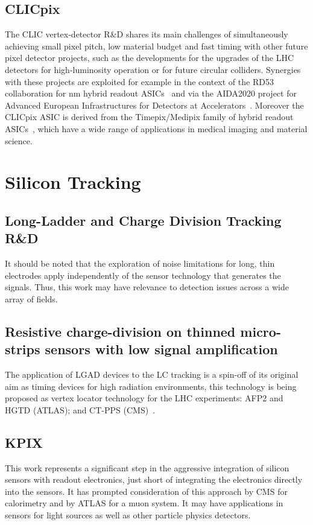\subsection{CLICpix}
The CLIC vertex-detector R\&D shares its main challenges of simultaneously achieving small pixel pitch,
low material budget and fast timing with other future pixel detector projects, such as the developments for
the upgrades of the LHC detectors for high-luminosity operation or for future circular colliders.
Synergies with these projects are exploited for example in the context of the RD53 collaboration for \unit[65]{nm} hybrid readout
ASICs~\cite{RD53} and via the AIDA2020 project for Advanced European Infrastructures for Detectors at
Accelerators~\cite{AIDA2020}.
Moreover the CLICpix ASIC is derived from the
Timepix/Medipix family of hybrid readout ASICs~\cite{medipix-collaboration}, which have a wide range of applications in
medical imaging and material science.

\section{Silicon Tracking}
\subsection{Long-Ladder and Charge Division Tracking R\&D}

It should be noted that the exploration of noise limitations for long, thin electrodes apply independently
of the sensor technology that generates the signals. Thus, this work may have
relevance to detection issues across a wide array of fields.

\subsection{Resistive charge-division on thinned micro-strips sensors with low signal amplification}
The application of LGAD devices to the LC tracking is a spin-off of its original aim as timing devices for high radiation environments, this technology is being proposed as vertex locator technology for the LHC experiments: AFP2 and HGTD (ATLAS); and CT-PPS (CMS)~\cite{Sadrozinski:CPAD2015}.

\subsection{KPIX}
This work represents a significant step in the aggressive integration of silicon sensors with readout electronics, just short of integrating the electronics directly into the sensors. It has prompted consideration of this approach by CMS for calorimetry and by ATLAS for a muon system.  It may have applications in sensors for light sources as well as other particle physics detectors.

